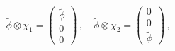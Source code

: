 \begin{equation}
\label{spinor-tensor}
\tilde \phi \otimes \chi_1 = 
\left(\begin{array}{c}
\tilde \phi \\
0 \\
0
\end{array}\right) \, , \quad
\tilde \phi \otimes \chi_2 = 
\left(\begin{array}{c}
0 \\
0 \\
\tilde \phi 
\end{array}\right) \, ,
\end{equation}

